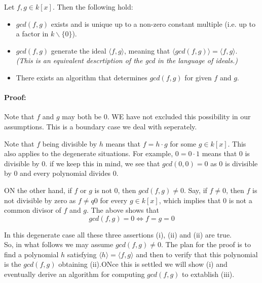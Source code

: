 \begin{proposition}[title = Proposition 1.5.7]
    Let $f, g \in k[x]$. Then the following hold:
    \begin{itemize}
      \item[(i)] $gcd(f,g)$ exists and is unique up to a non-zero constant multiple (i.e. up to a factor in $k\backslash \{0\}$). 
      \item[(ii)] $gcd(f,g)$ generate the ideal $\langle f,g \rangle$, meaning that $\langle gcd(f,g) \rangle = \langle f,g \rangle$.   \\
            \hspace*{0.5cm}\textit{\textcolor{airforceblue}{(This is an equivalent descrtiption of the gcd in the language of ideals.)}}
      \item[(iii)] There exists an algorithm that determines $gcd(f, g)$ for given $f$ and $g$. 
    \end{itemize} 

    \paragraph{Proof:} Note that $f$ and $g$ may both be 0. WE have not excluded this possibility in our assumptions. This is a boundary case we deal with seperately. 

    Note that $f$ being divisible by $h$ means that $f = h \cdot g$ for some $g \in k[x]$. This also applies to the degenerate situations. For example, $0 = 0 \cdot 1$ means that 
    0 is divisible by 0. if we keep this in mind, we see that $gcd(0,0) = 0$ as 0 is divisible by 0 and every polynomial divides 0.
    
    ON the other hand, if $f$ or $g$ is not 0, then $gcd(f,g) \neq 0$. Say, if $f \neq 0$, then $f$ is not divisible by zero as $f \neq q  0$ for every $g \in k[x]$, which implies 
    that 0 is not a common divisor of $f$ and $g$. The above shows that \[gcd(f,g) = 0 \Leftrightarrow f = g =0\]  

    In this degenerate case all these three assertions (i), (ii) and (ii) are true.  \\

    So, in what follows we may assume $gcd(f,g) \neq 0$. The plan for the proof is to find a polynomial $h$ satisfying $\langle h \rangle = \langle f,g \rangle$ and then to 
    verify that this polynomial is the $gcd(f,g)$ obtaining (ii).ONce this is settled we will show (i) and eventually derive an algorithm for computing $gcd(f,g)$ to extablish (iii). \\


\end{proposition}
